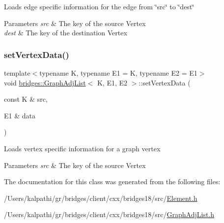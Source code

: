 Loads edge specific information for the edge from \char`\"{}src\char`\"{} to \char`\"{}dest\char`\"{}


\begin{DoxyParams}{Parameters}
{\em src} & The key of the source Vertex \\
\hline
{\em dest} & The key of the destination Vertex \\
\hline
\end{DoxyParams}
\mbox{\label{classbridges_1_1_graph_adj_list_aa30a944a429e0422cbe0ddd7bdbd353b}} 
\subsubsection{\texorpdfstring{set\+Vertex\+Data()}{setVertexData()}}
{\footnotesize\ttfamily template$<$typename K, typename E1 = K, typename E2 = E1$>$ \\
void \mbox{\hyperlink{classbridges_1_1_graph_adj_list}{bridges\+::\+Graph\+Adj\+List}}$<$ K, E1, E2 $>$\+::set\+Vertex\+Data (\begin{DoxyParamCaption}\item[{const K \&}]{src,  }\item[{E1 \&}]{data }\end{DoxyParamCaption})\hspace{0.3cm}{\ttfamily [inline]}}

Loads vertex specific information for a graph vertex


\begin{DoxyParams}{Parameters}
{\em src} & The key of the source Vertex \\
\hline
\end{DoxyParams}


The documentation for this class was generated from the following files\+:\begin{DoxyCompactItemize}
\item 
/\+Users/kalpathi/gr/bridges/client/cxx/bridges18/src/\mbox{\hyperlink{_element_8h}{Element.\+h}}\item 
/\+Users/kalpathi/gr/bridges/client/cxx/bridges18/src/\mbox{\hyperlink{_graph_adj_list_8h}{Graph\+Adj\+List.\+h}}\end{DoxyCompactItemize}
